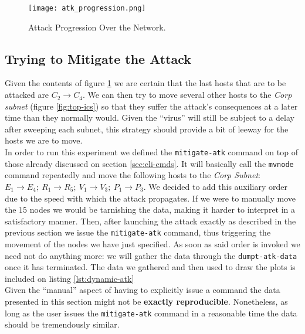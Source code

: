             \begin{figure}
                \centering
                \texttt{[image: atk\_progression.png]}
                \caption[Attack Progression]{Attack Progression Over the Network.}
                \label{fig:atk-progression}
            \end{figure}

            

        \subsection{Trying to Mitigate the Attack}
            Given the contents of figure \ref{fig:atk-progression} we are certain that the last hosts that are to be attacked are $C_2 \to C_4$. We can then try to move several other hosts to the \textit{Corp subnet} (figure \ref{fig:top-ics}) so that they suffer the attack's consequences at a later time than they normally would. Given the ``virus'' will still be subject to a delay after sweeping each subnet, this strategy should provide a bit of leeway for the hosts we are to move.\\

            In order to run this experiment we defined the \texttt{mitigate-atk} command on top of those already discussed on section \ref{sec:cli-cmds}. It will basically call the \texttt{mvnode} command repeatedly and move the following hosts to the \textit{Corp Subnet}: $E_1 \to E_4;\ R_1 \to R_5;\ V_1 \to V_3;\ P_1 \to P_3$. We decided to add this auxiliary order due to the speed with which the attack propagates. If we were to manually move the $15$ nodes we would be tarnishing the data, making it harder to interpret in a satisfactory manner. Then, after launching the attack exactly as described in the previous section we issue the \texttt{mitigate-atk} command, thus triggering the movement of the nodes we have just specified. As soon as said order is invoked we need not do anything more: we will gather the data through the \texttt{dumpt-atk-data} once it has terminated. The data we gathered and then used to draw the plots is included on listing \ref{lst:dynamic-atk}\\

            Given the ``manual'' aspect of having to explicitly issue a command the data presented in this section might not be \textbf{exactly reproducible}. Nonetheless, as long as the user issues the \texttt{mitigate-atk} command in a reasonable time the data should be tremendously similar.\\

